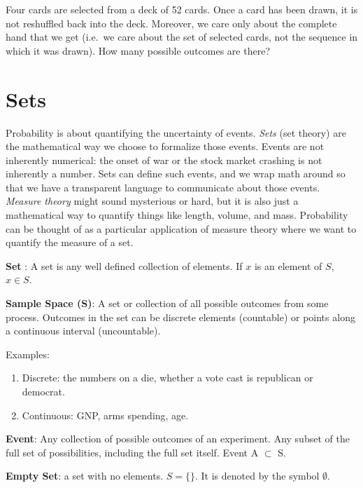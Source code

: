 \documentclass[
]{book}
\begin{document}
\begin{exercise}[Counting]
\protect\hypertarget{exr:counting1}{}\label{exr:counting1}Four cards are selected from a deck of 52 cards. Once a card has been drawn, it is not reshuffled back into the deck. Moreover, we care only about the complete hand that we get (i.e.~we care about the set of selected cards, not the sequence in which it was drawn). How many possible outcomes are there?
\end{exercise}

\hypertarget{setoper}{%
\section{Sets}\label{setoper}}

Probability is about quantifying the uncertainty of events. \emph{Sets} (set theory) are the mathematical way we choose to formalize those events. Events are not inherently numerical: the onset of war or the stock market crashing is not inherently a number. Sets can define such events, and we wrap math around so that we have a transparent language to communicate about those events. \emph{Measure theory} might sound mysterious or hard, but it is also just a mathematical way to quantify things like length, volume, and mass. Probability can be thought of as a particular application of measure theory where we want to quantify the measure of a set.

\textbf{Set} : A set is any well defined collection of elements. If \(x\) is an element of \(S\), \(x \in S\).

\textbf{Sample Space (S)}: A set or collection of all possible outcomes from some process. Outcomes in the set can be discrete elements (countable) or points along a continuous interval (uncountable).

Examples:

\begin{enumerate}
\def\labelenumi{\arabic{enumi}.}
\tightlist
\item
  Discrete: the numbers on a die, whether a vote cast is republican or democrat.
\item
  Continuous: GNP, arms spending, age.
\end{enumerate}

\textbf{Event}: Any collection of possible outcomes of an experiment. Any subset of the full set of possibilities, including the full set itself. Event A \(\subset\) S.

\textbf{Empty Set}: a set with no elements. \(S = \{\}\). It is denoted by the symbol \(\emptyset\).
\end{document}
